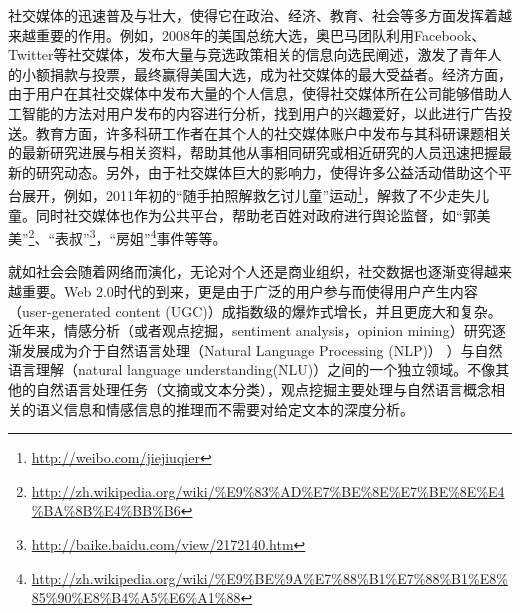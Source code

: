社交媒体的迅速普及与壮大，使得它在政治、经济、教育、社会等多方面发挥着越来越重要的作用。例如，2008年的美国总统大选，奥巴马团队利用Facebook、Twitter等社交媒体，发布大量与竞选政策相关的信息向选民阐述，激发了青年人的小额捐款与投票，最终赢得美国大选，成为社交媒体的最大受益者。经济方面，由于用户在其社交媒体中发布大量的个人信息，使得社交媒体所在公司能够借助人工智能的方法对用户发布的内容进行分析，找到用户的兴趣爱好，以此进行广告投送。教育方面，许多科研工作者在其个人的社交媒体账户中发布与其科研课题相关的最新研究进展与相关资料，帮助其他从事相同研究或相近研究的人员迅速把握最新的研究动态。另外，由于社交媒体巨大的影响力，使得许多公益活动借助这个平台展开，例如，2011年初的“随手拍照解救乞讨儿童”运动\footnote{\url{http://weibo.com/jiejiuqier}}，解救了不少走失儿童。同时社交媒体也作为公共平台，帮助老百姓对政府进行舆论监督，如“郭美美”\footnote{\url{http://zh.wikipedia.org/wiki/\%E9\%83\%AD\%E7\%BE\%8E\%E7\%BE\%8E\%E4\%BA\%8B\%E4\%BB\%B6}}、“表叔”\footnote{\url{http://baike.baidu.com/view/2172140.htm}}，“房姐”\footnote{\url{http://zh.wikipedia.org/wiki/\%E9\%BE\%9A\%E7\%88\%B1\%E7\%88\%B1\%E8\%85\%90\%E8\%B4\%A5\%E6\%A1\%88}}事件等等。

就如社会会随着网络而演化，无论对个人还是商业组织，社交数据也逐渐变得越来越重要。Web 2.0时代的到来，更是由于广泛的用户参与而使得用户产生内容（user-generated content (UGC)）成指数级的爆炸式增长，并且更庞大和复杂。近年来，情感分析（或者观点挖掘，sentiment analysis，opinion mining）研究逐渐发展成为介于自然语言处理（Natural Language Processing (NLP)） ）与自然语言理解（natural language understanding(NLU)）之间的一个独立领域。不像其他的自然语言处理任务（文摘或文本分类），观点挖掘主要处理与自然语言概念相关的语义信息和情感信息的推理而不需要对给定文本的深度分析。

